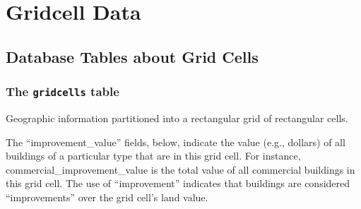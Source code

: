 \chapter{Gridcell Data}


\section{Database Tables about Grid Cells}
\label{sec:gridcell-tables}

\subsection{The {\tt gridcells} table}

Geographic information partitioned into a rectangular grid of rectangular cells.

The ``improvement_value'' fields, below, indicate the value (e.g., dollars) of
all buildings of a particular type that are in this grid cell. For instance,
commercial_improvement_value is the total value of all commercial buildings in
this grid cell. The use of ``improvement'' indicates that buildings are
considered ``improvements'' over the grid cell's land value.

